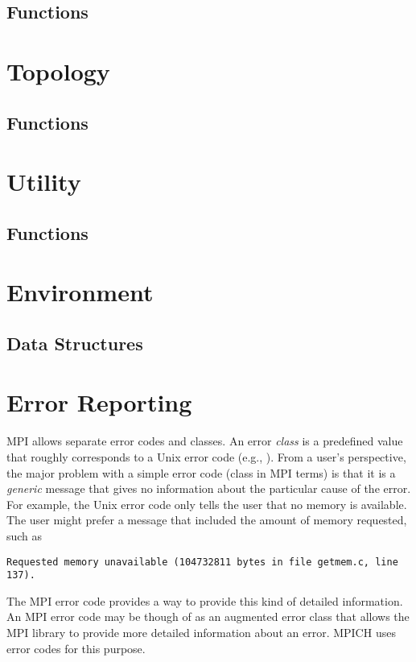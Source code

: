 \documentclass[dvipdfm]{article}
\begin{document}
\subsection{Functions}


\section{Topology}

\subsection{Functions}


\section{Utility}
\subsection{Functions}

 

\section{Environment}
\subsection{Data Structures}

%

\section{Error Reporting}
MPI allows separate error codes and classes.  An error \emph{class} is
a predefined value that roughly corresponds to a Unix error code
(e.g., ).  From a user's perspective, the major problem
with a simple error code (class in MPI terms) is that it is a
\emph{generic} message that gives no information about the particular
cause of the error.  For example, the Unix error code 
only tells the user that no memory is available.  The user might
prefer a message that included the amount of memory requested, such as 
\begin{verbatim}
Requested memory unavailable (104732811 bytes in file getmem.c, line 137).
\end{verbatim}
The MPI error code provides a way to provide this kind of detailed
information.  An MPI error code may be though of as an
augmented error class that allows the MPI library to provide more
detailed information about an error.  MPICH uses error codes for this
purpose.  
\end{document}
